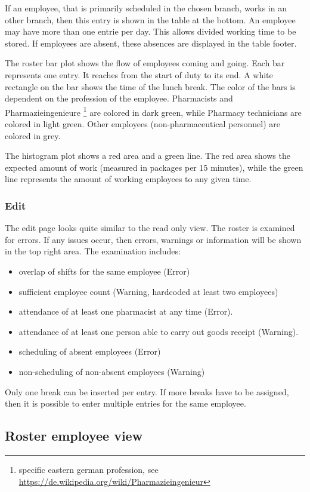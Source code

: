 If an employee, that is primarily scheduled in the chosen branch, works in an other branch, then this entry is shown in the table at the bottom.
An employee may have more than one entrie per day. This allows divided working time to be stored.
If employees are absent, these absences are displayed in the table footer.


The roster bar plot shows the flow of employees coming and going. Each bar represents one entry. It reaches from the start of duty to its end. A white rectangle on the bar shows the time of the lunch break. The color of the bars is dependent on the profession of the employee. Pharmacists and Pharmazieingenieure \footnote{specific eastern german profession, see \url{https://de.wikipedia.org/wiki/Pharmazieingenieur}} are colored in dark green, while Pharmacy technicians are colored in light green. Other employees (non-pharmaceutical personnel) are colored in grey.

The histogram plot shows a red area and a green line. The red area shows the expected amount of work (measured in packages per 15 minutes), while the green line represents the amount of working employees to any given time.


\subsubsection{Edit}
The edit page looks quite similar to the read only view. 
The roster is examined for errors. If any issues occur, then errors, warnings or information will be shown in the top right area.
The examination includes:
\begin{itemize}
    \item overlap of shifts for the same employee (Error)
    \item sufficient employee count (Warning, hardcoded at least two employees)
    \item attendance of at least one pharmacist at any time (Error).
    \item attendance of at least one person able to carry out goods receipt (Warning).
    \item scheduling of absent employees (Error)
    \item non-scheduling of non-absent employees (Warning)
\end{itemize}

Only one break can be inserted per entry. If more breaks have to be assigned, then it is possible to enter multiple entries for the same employee.
\subsection{Roster employee view}
